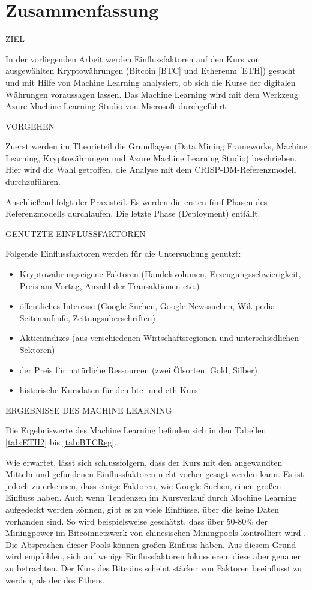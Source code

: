 \chapter*{Zusammenfassung}

{\normalsize ZIEL} \par
In der vorliegenden Arbeit werden Einflussfaktoren auf den Kurs von ausgewählten Kryptowährungen (Bitcoin [BTC] und Ethereum [ETH]) gesucht und mit Hilfe von Machine Learning analysiert, ob sich die Kurse der digitalen Währungen voraussagen lassen. Das Machine Learning wird mit dem Werkzeug Azure Machine Learning Studio von Microsoft durchgeführt.

{\normalsize VORGEHEN} \par
Zuerst werden im Theorieteil die Grundlagen (Data Mining Frameworks, Machine Learning, Kryptowährungen und Azure Machine Learning Studio) beschrieben. Hier wird die Wahl getroffen, die Analyse mit dem CRISP-DM-Referenzmodell durchzuführen.\par
Anschließend folgt der Praxisteil. Es werden die ersten fünf Phasen des Referenzmodells durchlaufen. Die letzte Phase (Deployment) entfällt.

{\normalsize GENUTZTE EINFLUSSFAKTOREN} \par
Folgende Einflussfaktoren werden für die Untersuchung genutzt:
\begin{itemize}
\item Kryptowährungseigene Faktoren (Handelsvolumen, Erzeugungsschwierigkeit, Preis am Vortag, Anzahl der Transaktionen etc.)
\item öffentliches Interesse (Google Suchen, Google Newssuchen, Wikipedia Seitenaufrufe, Zeitungsüberschriften)
\item Aktienindizes (aus verschiedenen Wirtschaftsregionen und unterschiedlichen Sektoren)
\item der Preis für natürliche Ressourcen (zwei Ölsorten, Gold, Silber)
\item historische Kursdaten für den \gls{btc}- und \gls{eth}-Kurs
\end{itemize}

{\normalsize ERGEBNISSE DES MACHINE LEARNING} \par
Die Ergebniswerte des Machine Learning befinden sich in den Tabellen \ref{tab:ETH2} bis \ref{tab:BTCReg}.\par
Wie erwartet, lässt sich schlussfolgern, dass der Kurs mit den angewandten Mitteln und gefundenen Einflussfaktoren nicht vorher gesagt werden kann. Es ist jedoch zu erkennen, dass einige Faktoren, wie Google Suchen, einen großen Einfluss haben. Auch wenn Tendenzen im Kursverlauf durch Machine Learning aufgedeckt werden können, gibt es zu viele Einflüsse, über die keine Daten vorhanden sind. So wird beispielsweise geschätzt, dass über 50-80\% der Miningpower im Bitcoinnetzwerk von chinesischen Miningpools kontrolliert wird . Die Absprachen dieser Pools können großen Einfluss haben. Aus diesem Grund wird empfohlen, sich auf wenige Einflussfaktoren fokussieren, diese aber genauer zu betrachten. 
Der Kurs des Bitcoins scheint stärker von Faktoren beeinflusst zu werden, als der des Ethers.

